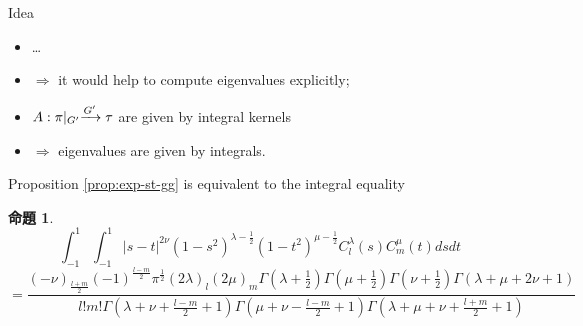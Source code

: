 \documentclass[pdf,notes]{beamer}
\renewcommand{\implies}{\Rightarrow}
\newtheorem{prop}{命題}
\begin{document}
\begin{frame}{Idea}
	\begin{itemize}%
		\item \ldots
		\item $\implies$ it would help to compute eigenvalues explicitly;
		\item $\mysbo$ are given by integral kernels 
		\item $\implies$ eigenvalues are given by integrals.
	\end{itemize}
\end{frame}
\begin{frame}
	Proposition \ref{prop:exp-st-gg} is equivalent to the integral equality
	\begin{prop}
		\label{prop:int-st-gg}
		\begin{equation*}
			\int_{- 1}^1 \int_{- 1}^1 | s - t |^{2 \nu} (1 - s^2)^{\lambda - \frac{1}{2}}
			(1 - t^2)^{\mu - \frac{1}{2}} C_l^{\lambda} (s) C_m^{\mu} (t) d s d t
		\end{equation*}
		{\scriptsize
		\begin{equation}
			=\frac{(- \nu)_{\frac{l + m}{2}} (- 1)^{\frac{l - m}{2}} \pi^{\frac{1}{2}} (2
			\lambda)_l (2 \mu)_m \Gamma \left( \lambda + \frac{1}{2} \right) \Gamma \left(
			\mu + \frac{1}{2} \right) \Gamma \left( \nu + \frac{1}{2} \right) \Gamma
		(\lambda + \mu + 2 \nu + 1)}{l!m! \Gamma \left( \lambda + \nu + \frac{l -
		m}{2} + 1 \right) \Gamma \left( \mu + \nu - \frac{l - m}{2} + 1 \right) \Gamma
		\left( \lambda + \mu + \nu + \frac{l + m}{2} + 1 \right)}
			\label{eqn:int-st-gg}
			\tag{1$'$}
		\end{equation}
		}
	\end{prop}
\end{frame}
\end{document}
